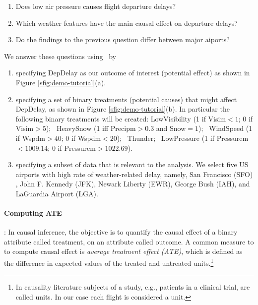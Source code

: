 \begin{enumerate}
  \item Does low air pressure causes flight departure delays?
  \item Which weather features have the main causal effect on departure delays?
  \item Do the findings to the previous question differ between major aiports?
\end{enumerate}
We answer these questions using \GSQL\ by
    \begin{enumerate}
      \item specifying DepDelay as our outcome of interest (potential effect) as shown in Figure \ref{sfig:demo-tutorial}(a).
      \item specifying a set of binary treatments (potential causes) that might affect DepDelay, 
      as shown in Figure \ref{sfig:demo-tutorial}(b). 
      In particular the following binary treatments will be created: LowVisibility (1 if Visim$<1$; 0 if Visim$>5$); \ HeavySnow (1 iff Precipm$>0.3$ and Snow$=1$); \ WindSpeed (1 if Wspdm$>40$; 0 if Wspdm$<20$); \  Thunder; \ LowPressure (1 if Pressurem$<1009.14$; 0 if Pressurem$>1022.69$).


      \item specifying a subset of data that is relevant to the analysis.  We select five US airports  with high rate of weather-related delay, namely, San Francisco (SFO) , John F. Kennedy (JFK), Newark Liberty (EWR), George Bush (IAH), and LaGuardia Airport (LGA).
\end{enumerate}


 \paragraph{ \bf Computing ATE}: In causal inference, the objective is to quantify
 the causal effect of a binary attribute called treatment, on an attribute called outcome.
 A common measure to to compute causal effect is {\em average treatment effect (ATE)}, which is defined as the difference in expected values of the treated and untreated units.\footnote{In causality literature subjects of a study,
  e.g., patients in a clinical trial, are called units. In our case each flight is considered a unit.}

